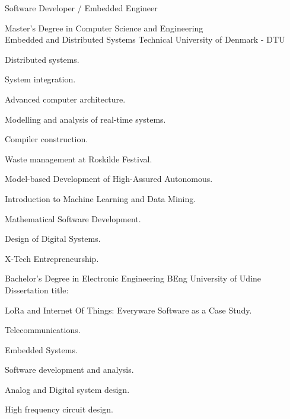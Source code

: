 \documentclass[english,a4paper]{europasscv}
\begin{document}
	\begin{europasscv}

	\ecvpersonalinfo
	 {
          Software Developer / Embedded Engineer
	}



		 {
                  Master’s Degree in Computer Science and Engineering\\
		  \textcolor{ecvhighlightcolor}{Embedded and Distributed Systems}
		}{}
		\ecvitem{} {
                  Technical University of Denmark - DTU \newline
		}
		\ecvitem{} {
			\begin{ecvitemize}
				\item Distributed systems.
				\item System integration.
				\item Advanced computer architecture.
				\item Modelling and analysis of real-time systems.
				\item Compiler construction.
                                \item Waste management at Roskilde Festival. 
                                \item Model-based Development of High-Assured Autonomous.
                                \item Introduction to Machine Learning and Data Mining.
                                \item Mathematical Software Development.
                                \item Design of Digital Systems.
                                \item X-Tech Entrepreneurship.
			\end{ecvitemize}
		}
		 {
			Bachelor's Degree in Electronic Engineering
		}{BEng}
		\ecvitem{} {
			University of Udine \newline
		}
		\ecvitem{} {
			\textcolor{ecvhighlightcolor}{Dissertation title}:
		}
		\begin{center} {
				LoRa and Internet Of Things: \linebreak
				Everyware Software as a Case Study.
		}
		\end{center}
		\ecvitem{} {
			\begin{ecvitemize}
				\item Telecommunications.
				\item Embedded Systems.
				\item Software development and analysis.
				\item Analog and Digital system design.
				\item High frequency circuit design.
			\end{ecvitemize}
		}


\end{europasscv}
\end{document}
